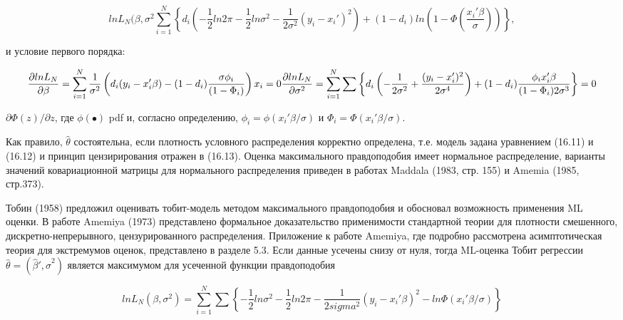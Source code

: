 \begin{equation}
ln L_N(\beta,\sigma^2\sum_{i=1}^N
\left\lbrace d_i\left(-\dfrac{1}{2}ln{2\pi}-\dfrac{1}{2}ln{\sigma^2-\dfrac{1}{2\sigma^2}(y_i-x_i')^2}\right)+(1-d_i)ln \left(1-\Phi
\left( \dfrac{x_i'\beta}{\sigma}\right)\right)\right\rbrace,
\end{equation}

и условие первого порядка:

\begin{equation}
\dfrac{\partial ln L_N}{\partial\beta}=\sum_{i=1}^N\dfrac{1}{\sigma^2}\left(d_i(y_i-x_i'\beta)-(1-d_i)\dfrac{\sigma\phi_i}{(1-\Phi_i)}\right)x_i=0 \\
\dfrac{\partial ln L_N}{\partial\sigma^2}=\sum_{i=1}^N\sum\left\lbrace d_i \left(-\dfrac{1}{2\sigma^2}+\dfrac{(y_i-x_i')^2}{2\sigma^4}\right)+(1-d_i)\dfrac{\phi_i x_i'\beta}{(1-\Phi_i)2\sigma^3}\right\rbrace=0
\end{equation}


$\partial\Phi(z)/\partial{z}$, где $\phi(\bullet)$ pdf и, согласно определению, $\phi_i=\phi(x_i'\beta/\sigma)$ и $\Phi_i=\Phi(x_i'\beta/\sigma)$.


Как правило, $\hat{\theta}$ состоятельна, если плотность условного распределения корректно определена, т.е. модель задана уравнением (16.11) и (16.12) и принцип цензирирования отражен в (16.13). Оценка максимального правдоподобия имеет нормальное распределение, варианты значений ковариационной матрицы для нормального распределения приведен в работах Maddala (1983, стр. 155) и Amemia (1985, стр.373).

Тобин (1958) предложил оценивать тобит-модель методом максимального правдоподобия и обосновал возможность применения ML оценки. В работе Amemiya (1973) представлено формальное доказательство применимости стандартной теории для плотности смешенного, дискретно-непрерывного, цензурированного распределения. Приложение к работе Amemiya, где подробно рассмотрена асимптотическая теория для экстремумов оценок, представлено в разделе 5.3.
Если данные усечены снизу от нуля, тогда ML-оценка Тобит регрессии $\hat{\theta}=(\hat{\beta}',\hat{\sigma}^2)$ является максимумом для усеченной функции правдоподобия


\begin{equation}
ln{L_N(\beta,\sigma^2)}=\sum_{i=1}^N{\sum\left\lbrace -\dfrac{1}{2}ln{\sigma^2}-\dfrac{1}{2}{ln{2\pi}}-\dfrac{1}{2sigma^2}(y_i-x_i'\beta)^2-ln{\Phi(x_i'\beta/\sigma)}\right\rbrace }
\end{equation}

